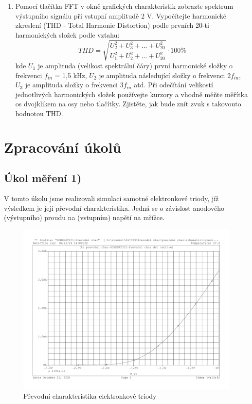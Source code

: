 \documentclass[a4paper, czech]{article}
\begin{document}
\begin{enumerate}
    \pagebreak
    \item Pomocí tlačítka FFT v okně grafických charakteristik zobrazte spektrum výstupního signálu při vstupní amplitudě 2 V. Vypočítejte harmonické zkreslení (THD - Total Harmonic Distortion) podle prvních 20-ti harmonických složek podle vztahu:
    \begin{equation*}
        THD = \sqrt{\frac{U_2^2 + U_3^2 + ... + U_{20}^2}{U_1^2 + U_2^2 + ... + U_{20}^2}} \cdot 100 \%
    \end{equation*}
    kde $U_1$ je amplituda (velikost spektrální čáry) první harmonické složky o frekvenci $f_{in}$ = 1,5 kHz, $U_2$ je amplituda následující složky o frekvenci $2 f_{in}$, $U_3$ je amplituda složky o frekvenci $3f_{in}$ atd. Při odečítání velikostí jednotlivých harmonických složek používejte kurzory a vhodně měňte měřítka os dvojklikem na osy nebo tlačítky. Zjistěte, jak bude znít zvuk s takovouto hodnotou THD.
\end{enumerate}

\section{Zpracování úkolů}

\subsection{Úkol měření 1)}

V tomto úkolu jsme realizovali simulaci samotné elektronkové triody, jíž výsledkem je její převodní charakteristika.
Jedná se o závislost anodového (výstupního) proudu na (vstupním) napětí na mřížce.

\begin{figure}[H]
    \centering
    \includegraphics[width=\textwidth]{charakteristiky/ULOHA1.pdf}
    \caption{Převodní charakteristika elektronkové triody}
\end{figure}
\end{document}
